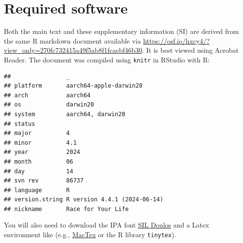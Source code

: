 \documentclass[
  11pt,
  man,mask,floatsintext]{apa6}
\newcommand{\changelocaltocdepth}[1]{%
  \addtocontents{toc}{\protect\setcounter{tocdepth}{#1}}%
  \setcounter{tocdepth}{#1}%
}
\begin{document}
\singlespacing

\setcounter{page}{1}
\setcounter{section}{0}
\setcounter{footnote}{0}
\setcounter{figure}{0}
\setcounter{table}{0}
\setcounter{equation}{0}
\renewcommand{\thesection}{\S \arabic{section}}
\renewcommand{\theHsection}{sisection. \arabic{section}}
\renewcommand{\thefootnote}{S\arabic{footnote}}
\renewcommand{\thefigure}{S\arabic{figure}}
\renewcommand{\thetable}{S\arabic{table}}
\renewcommand{\theequation}{S\arabic{equation}}

\changelocaltocdepth{3}
\tableofcontents

\section{Required software}\label{sec:software}

Both the main text and these supplementary information (SI) are derived from the same R markdown document available via \href{OSF}{https://osf.io/hxcy4/?view\_only=270fc732415a49f5ab8f1fcaebf46b30}. It is best viewed using Acrobat Reader. The document was compiled using \texttt{knitr} in RStudio with R:

\begin{verbatim}
##                _                           
## platform       aarch64-apple-darwin20      
## arch           aarch64                     
## os             darwin20                    
## system         aarch64, darwin20           
## status                                     
## major          4                           
## minor          4.1                         
## year           2024                        
## month          06                          
## day            14                          
## svn rev        86737                       
## language       R                           
## version.string R version 4.4.1 (2024-06-14)
## nickname       Race for Your Life
\end{verbatim}

You will also need to download the IPA font \href{https://software.sil.org/doulos/download/}{SIL Doulos} and a Latex environment like (e.g., \href{https://tug.org/mactex/mactex-download.html}{MacTex} or the R library \texttt{tinytex}).
\end{document}

